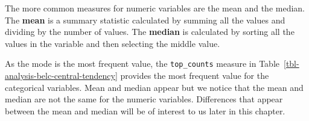 \documentclass[
  letterpaper,
]{book}
\theoremstyle{definition}
\theoremstyle{remark}
\begin{document}
The more common measures for numeric variables are the mean and the
median. The \textbf{mean} is a summary statistic calculated by summing
all the values and dividing by the number of values. The \textbf{median}
is calculated by sorting all the values in the variable and then
selecting the middle value.

\begin{table}

\caption{\label{tbl-analysis-belc-central-tendency}Central tendency
measures for the BELC dataset}

\begin{minipage}{0.50\linewidth}



\end{minipage}%
%
\begin{minipage}{0.50\linewidth}



\end{minipage}%

\end{table}%

As the mode is the most frequent value, the \texttt{top\_counts} measure
in Table~\ref{tbl-analysis-belc-central-tendency} provides the most
frequent value for the categorical variables. Mean and median appear but
we notice that the mean and median are not the same for the numeric
variables. Differences that appear between the mean and median will be
of interest to us later in this chapter.
\end{document}
